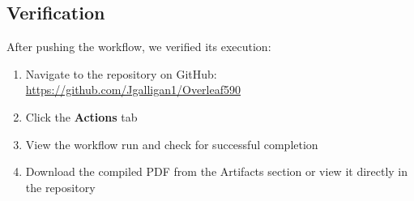 \subsection{Verification}

After pushing the workflow, we verified its execution:

\begin{enumerate}
    \item Navigate to the repository on GitHub: \url{https://github.com/Jgalligan1/Overleaf590}
    \item Click the \textbf{Actions} tab
    \item View the workflow run and check for successful completion
    \item Download the compiled PDF from the Artifacts section or view it directly in the repository
\end{enumerate}

